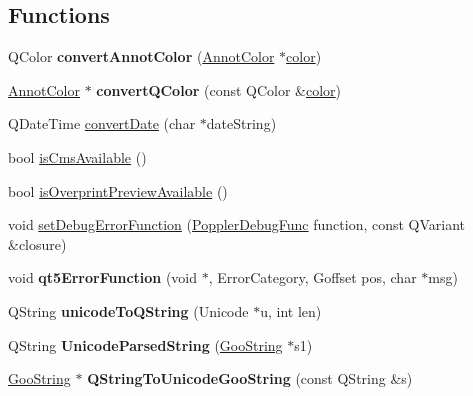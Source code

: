 \subsection*{Functions}
\begin{DoxyCompactItemize}
\item 
\mbox{\label{namespace_poppler_a2512487b9cdbbfaebe06d1306f12f43c}} 
Q\+Color {\bfseries convert\+Annot\+Color} (\hyperlink{class_annot_color}{Annot\+Color} $\ast$\hyperlink{structcolor}{color})
\item 
\mbox{\label{namespace_poppler_a884058a176bf6e7d87168bbc71f06e95}} 
\hyperlink{class_annot_color}{Annot\+Color} $\ast$ {\bfseries convert\+Q\+Color} (const Q\+Color \&\hyperlink{structcolor}{color})
\item 
Q\+Date\+Time \hyperlink{namespace_poppler_a80926c85a77588d71bc0b9dd70f1d6c1}{convert\+Date} (char $\ast$date\+String)
\item 
bool \hyperlink{namespace_poppler_a21ef0e2c0c9cfed4548570f8d9c47879}{is\+Cms\+Available} ()
\item 
bool \hyperlink{namespace_poppler_a0707427249c4a5410c4f94fcbf6eae12}{is\+Overprint\+Preview\+Available} ()
\item 
void \hyperlink{namespace_poppler_a010dcf12e3dae28959925da8cbf97cda}{set\+Debug\+Error\+Function} (\hyperlink{namespace_poppler_a6743a660a5959ea508737ff913e3bd56}{Poppler\+Debug\+Func} function, const Q\+Variant \&closure)
\item 
\mbox{\label{namespace_poppler_aae39ecddfc07e49289bbbb6c14685a47}} 
void {\bfseries qt5\+Error\+Function} (void $\ast$, Error\+Category, Goffset pos, char $\ast$msg)
\item 
\mbox{\label{namespace_poppler_a11b166136266a397323ddd9e0753bd17}} 
Q\+String {\bfseries unicode\+To\+Q\+String} (Unicode $\ast$u, int len)
\item 
\mbox{\label{namespace_poppler_a7773bae3fc63796c7e8506759a5d7ac7}} 
Q\+String {\bfseries Unicode\+Parsed\+String} (\hyperlink{class_goo_string}{Goo\+String} $\ast$s1)
\item 
\mbox{\label{namespace_poppler_a156190d500b2a99c4fbac886d8acbbbf}} 
\hyperlink{class_goo_string}{Goo\+String} $\ast$ {\bfseries Q\+String\+To\+Unicode\+Goo\+String} (const Q\+String \&s)

\end{DoxyCompactItemize}

